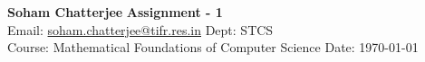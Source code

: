 \documentclass[a4paper, 11pt]{article}
\begin{document}
	
	
	{\noindent \large\textbf{Soham Chatterjee} \hfill \textbf{Assignment - 1}\\
		Email: \href{soham.chatterjee@tifr.res.in}{soham.chatterjee@tifr.res.in} \hfill Dept: STCS\\
		\normalsize Course: Mathematical Foundations of Computer Science \hfill Date: \today}
	
	
\end{document}
